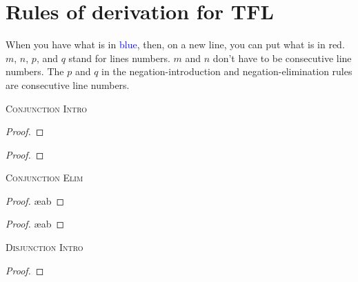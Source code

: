 \newpage


\section{Rules of derivation for TFL}\label{ProofRules}

When you have what is in \textcolor{blue}{blue}, then, on a new line, you can put what is in \textcolor{red2}{red}. $m$, $n$, $p$, and $q$ stand for lines numbers. $m$ and $n$ don't have to be consecutive line numbers. The $p$ and $q$ in the negation-introduction and negation-elimination rules are consecutive line numbers.

\setlength{\columnsep}{2.25cm}
\begin{multicols}{2}

\noindent\textsc{Conjunction Intro}

\begin{proof}
	 
\end{proof}

\begin{proof}
	 
\end{proof}
\bigskip

\noindent\textsc{Conjunction Elim}

\begin{proof}
	 \ae{ab}
\end{proof}

\begin{proof}
	 \ae{ab}
\end{proof}
\bigskip



\vfill\null
\columnbreak

\noindent\textsc{Disjunction Intro}

\begin{proof}
	 
\end{proof}


\end{multicols}
